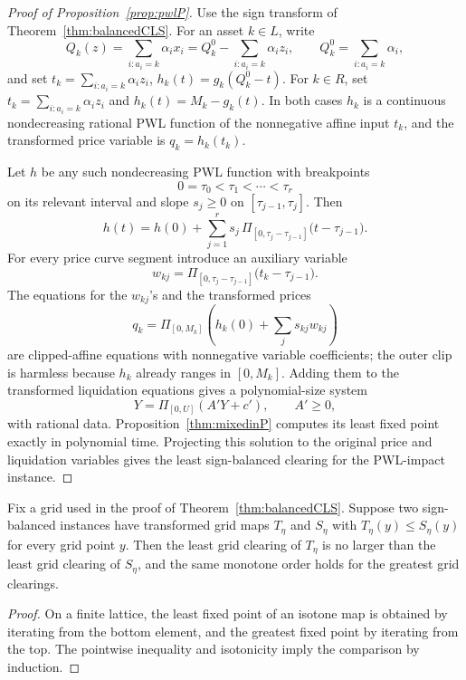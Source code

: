 \documentclass{llncs}
\newcommand{\clip}{\Pi}
\begin{document}
\begin{proof}[Proof of Proposition~\ref{prop:pwlP}]
Use the sign transform of Theorem~\ref{thm:balancedCLS}. For an asset \(k\in L\), write
\[
   Q_k(z)=\sum_{i:a_i=k}\alpha_i x_i
          =Q_k^0-\sum_{i:a_i=k}\alpha_i z_i,
   \qquad Q_k^0=\sum_{i:a_i=k}\alpha_i ,
\]
and set \(t_k=\sum_{i:a_i=k}\alpha_i z_i\), \(h_k(t)=g_k(Q_k^0-t)\). For \(k\in R\), set \(t_k=\sum_{i:a_i=k}\alpha_i z_i\) and \(h_k(t)=M_k-g_k(t)\). In both cases \(h_k\) is a continuous nondecreasing rational PWL function of the nonnegative affine input \(t_k\), and the transformed price variable is \(q_k=h_k(t_k)\).

Let \(h\) be any such nondecreasing PWL function with breakpoints
\[
   0=\tau_0<\tau_1<\cdots<\tau_r
\]
on its relevant interval and slope \(s_j\ge0\) on \([\tau_{j-1},\tau_j]\). Then
\[
   h(t)=h(0)+\sum_{j=1}^r s_j\,
        \clip_{[0,\tau_j-\tau_{j-1}]}\bigl(t-\tau_{j-1}\bigr).
\]
For every price curve segment introduce an auxiliary variable
\[
   w_{kj}=\clip_{[0,\tau_j-\tau_{j-1}]}\bigl(t_k-\tau_{j-1}\bigr).
\]
The equations for the \(w_{kj}\)'s and the transformed prices
\[
   q_k=\clip_{[0,M_k]}\!\left(h_k(0)+\sum_j s_{kj}w_{kj}\right)
\]
are clipped-affine equations with nonnegative variable coefficients; the outer clip is harmless because \(h_k\) already ranges in \([0,M_k]\). Adding them to the transformed liquidation equations gives a polynomial-size system
\[
      Y=\clip_{[0,U]}(A'Y+c'),\qquad A'\ge0,
\]
with rational data. Proposition~\ref{thm:mixedinP} computes its least fixed point exactly in polynomial time. Projecting this solution to the original price and liquidation variables gives the least sign-balanced clearing for the PWL-impact instance.
\end{proof}

\begin{proposition}
\label{prop:comparative}
Fix a grid used in the proof of Theorem~\ref{thm:balancedCLS}.  Suppose two sign-balanced instances have transformed grid maps \(T_\eta\) and \(S_\eta\) with \(T_\eta(y)\le S_\eta(y)\) for every grid point \(y\). Then the least grid clearing of \(T_\eta\) is no larger than the least grid clearing of \(S_\eta\), and the same monotone order holds for the greatest grid clearings.
\end{proposition}
\begin{proof}
On a finite lattice, the least fixed point of an isotone map is obtained by iterating from the bottom element, and the greatest fixed point by iterating from the top. The pointwise inequality and isotonicity imply the comparison by induction.
\end{proof}
\end{document}
